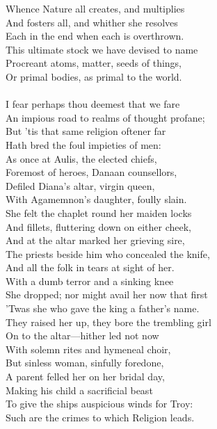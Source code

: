 Whence Nature all creates, and multiplies\\
And fosters all, and whither she resolves\\
Each in the end when each is overthrown.\\
This ultimate stock we have devised to name\\
Procreant atoms, matter, seeds of things,\\
Or primal bodies, as primal to the world.\\
\\
I fear perhaps thou deemest that we fare\\
An impious road to realms of thought profane;\\
But 'tis that same religion oftener far\\
Hath bred the foul impieties of men:\\
As once at Aulis, the elected chiefs,\\
Foremost of heroes, Danaan counsellors,\\
Defiled Diana's altar, virgin queen,\\
With Agamemnon's daughter, foully slain.\\
She felt the chaplet round her maiden locks\\
And fillets, fluttering down on either cheek,\\
And at the altar marked her grieving sire,\\
The priests beside him who concealed the knife,\\
And all the folk in tears at sight of her.\\
With a dumb terror and a sinking knee\\
She dropped; nor might avail her now that first\\
'Twas she who gave the king a father's name.\\
They raised her up, they bore the trembling girl\\
On to the altar—hither led not now\\
With solemn rites and hymeneal choir,\\
But sinless woman, sinfully foredone,\\
A parent felled her on her bridal day,\\
Making his child a sacrificial beast\\
To give the ships auspicious winds for Troy:\\
Such are the crimes to which Religion leads.\\
\\

